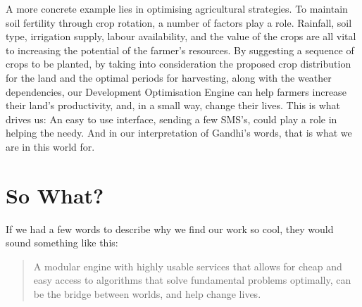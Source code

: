 \documentclass{report}
\begin{document}
A more concrete example lies in optimising agricultural strategies.  To maintain soil fertility through crop rotation, a number of factors play a role.  Rainfall, soil type, irrigation supply, labour availability, and the value of the crops are all vital to increasing the potential of the farmer's resources.  By suggesting a sequence of crops to be planted, by taking into consideration the proposed crop distribution for the land and the optimal periods for harvesting, along with the weather dependencies, our Development Optimisation Engine can help farmers increase their land's productivity, and, in a small way, change their lives.  This is what drives us: An easy to use interface, sending a few SMS's, could play a role in helping the needy.  And in our interpretation of Gandhi's words, that is what we are in this world for.

\section{So What?}
If we had a few words to describe why we find our work so cool, they would sound something like this:
\begin{quote}
A modular engine with highly usable services that allows for cheap and easy access to algorithms that solve fundamental problems optimally, can be the bridge between worlds, and help change lives.
\end{quote}
\end{document}
